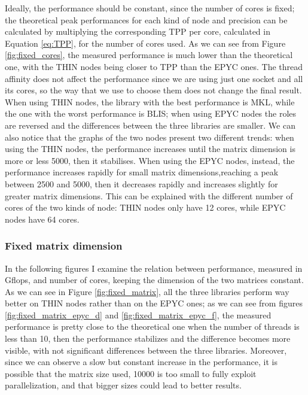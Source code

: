 \documentclass[12pt]{article}
\begin{document}
        Ideally, the performance should be constant, since the number of cores is fixed; the theoretical peak performances for each kind of node and precision can be calculated by multiplying the corresponding TPP per core, calculated in Equation \eqref{eq:TPP}, for the number of cores used.\newline
        As we can see from Figure \ref{fig:fixed_cores}, the measured performance is much lower than the theoretical one, with the THIN nodes being closer to TPP than the EPYC ones. The thread affinity does not affect the performance since we are using just one socket and all its cores, so the way that we use to choose them does not change the final result.\newline
        When using THIN nodes, the library with the best performance is MKL, while the one with the worst performance is BLIS; when using EPYC nodes the roles are reversed and the differences between the three libraries are smaller.\newline
        We can also notice that the graphs of the two nodes present two different trends: when using the THIN nodes, the performance increases until the matrix dimension is more or less 5000, then it stabilises. When using the EPYC nodes, instead, the performance increases rapidly for small matrix dimensions,reaching a peak between 2500 and 5000, then it decreases rapidly and increases slightly for greater matrix dimensions.\newline
        This can be explained with the different number of cores of the two kinds of node: THIN nodes only have 12 cores, while EPYC nodes have 64 cores.

        \subsubsection{Fixed matrix dimension}
            In the following figures I examine the relation between performance, measured in Gflops, and number of cores, keeping the dimension of the two matrices constant.\newline
            As we can see in Figure \ref{fig:fixed_matrix}, all the three libraries perform way better on THIN nodes rather than on the EPYC ones; as we can see from figures \ref{fig:fixed_matrix_epyc_d} and \ref{fig:fixed_matrix_epyc_f}, the measured performance is pretty close to the theoretical one when the number of threads is less than 10, then the performance stabilizes and the difference becomes more visible, with not significant differences between the three libraries. Moreover, since we can observe a slow but constant increase in the performance, it is possible that the matrix size used, 10000 is too small to fully exploit parallelization, and that bigger sizes could lead to better results.
\end{document}
